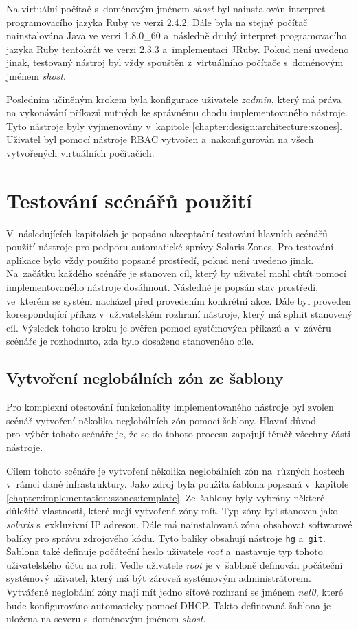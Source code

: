 Na virtuální počítač s~doménovým jménem \textit{shost} byl nainstalován interpret programovacího jazyka Ruby ve verzi 2.4.2.
Dále byla na stejný počítač nainstalována Java ve verzi 1.8.0\_60 a~následně druhý interpret programovacího jazyka Ruby
tentokrát ve verzi 2.3.3 a~implementaci JRuby. Pokud není uvedeno jinak, testovaný nástroj byl vždy spouštěn z~virtuálního
počítače s~doménovým jménem \textit{shost}.

Posledním učiněným krokem byla konfigurace uživatele \textit{zadmin}, který má práva na vykonávání příkazů nutných ke správnému
chodu implementovaného nástroje. Tyto nástroje byly vyjmenovány v~kapitole \ref{chapter:design:architecture:szones}. Uživatel 
byl pomocí nástroje RBAC vytvořen a~nakonfigurován na všech vytvořených virtuálních počítačích.
\section{Testování scénářů použití}
\label{chapter:testing:scenario}
V~následujících kapitolách je popsáno akceptační testování hlavních scénářů použití nástroje pro podporu automatické správy
Solaris Zones. Pro testování aplikace bylo vždy použito popsané prostředí, pokud není uvedeno jinak. Na~začátku každého scénáře
je stanoven cíl, který by uživatel mohl chtít pomocí implementovaného nástroje dosáhnout. Následně je popsán stav prostředí, ve~kterém
se systém nacházel před provedením konkrétní akce. Dále byl proveden korespondující příkaz v~uživatelském rozhraní nástroje,
který má splnit stanovený cíl. Výsledek tohoto kroku je ověřen pomocí systémových příkazů a~v~závěru scénáře je rozhodnuto, zda bylo
dosaženo stanoveného cíle.
\subsection{Vytvoření neglobálních zón ze šablony}
\label{chapter:testing:scenario:deploy_template}
Pro komplexní otestování funkcionality implementovaného nástroje byl zvolen scénář vytvoření několika neglobálních zón pomocí
šablony. Hlavní důvod pro~výběr tohoto scénáře je, že se do tohoto procesu zapojují téměř všechny části nástroje.

Cílem tohoto scénáře je vytvoření několika neglobálních zón na~různých hostech v~rámci dané infrastruktury. Jako zdroj byla 
použita šablona popsaná v~kapitole \ref{chapter:implementation:szones:template}. Ze~šablony byly vybrány některé důležité 
vlastnosti, které mají vytvořené zóny mít. Typ zóny byl stanoven jako \textit{solaris} s~exkluzivní IP adresou. Dále má 
nainstalovaná zóna obsahovat softwarové balíky pro správu zdrojového kódu. Tyto balíky obsahují nástroje \verb|hg|
a~\verb|git|. Šablona také definuje počáteční heslo uživatele \textit{root} a~nastavuje typ tohoto uživatelského účtu na roli.
Vedle uživatele \textit{root} je v~šabloně definován počáteční systémový uživatel, který má být zároveň systémovým administrátorem.
Vytvářené neglobální zóny mají mít jedno síťové rozhraní se jménem \textit{net0}, které bude konfigurováno automaticky pomocí
DHCP. Takto definovaná šablona je uložena na severu s~doménovým jménem \textit{shost}.

